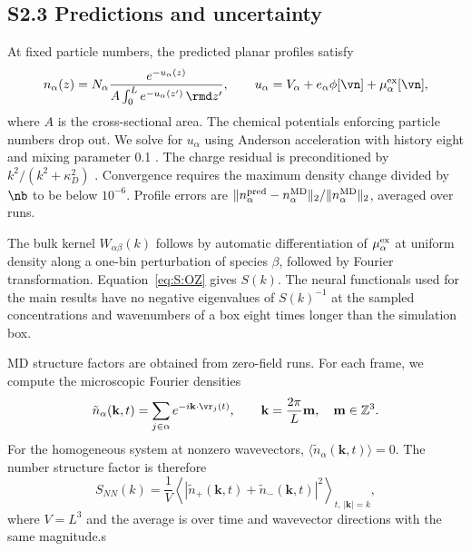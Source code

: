 \subsection*{S2.3 Predictions and uncertainty}
At fixed particle numbers, the predicted planar profiles satisfy
\begin{equation}
n_\alpha(z)=N_\alpha\frac{e^{-u_\alpha(z)}}{A\int_0^L e^{-u_\alpha(z')}\,\rmd z'},\qquad
u_\alpha=V_\alpha+e_\alpha\phi[\vn]+\mu^{\rm ex}_\alpha[\vn],
\label{eq:S:canon}
\end{equation}
where $A$ is the cross-sectional area. The chemical potentials enforcing particle numbers drop out. We solve for $u_\alpha$ using Anderson acceleration with history eight and mixing parameter 0.1 \cite{anderson1965iterative,walker2011anderson}. The charge residual is preconditioned by $k^2/(k^2+\kappa_D^2)$ \cite{kerker1981efficient}. Convergence requires the maximum density change divided by $\nb$ to be below $10^{-6}$. Profile errors are $\|n_\alpha^{\rm pred}-n_\alpha^{\rm MD}\|_2/\|n_\alpha^{\rm MD}\|_2$, averaged over runs.

The bulk kernel $W_{\alpha\beta}(k)$ follows by automatic differentiation of $\mu^{\rm ex}_\alpha$ at uniform density along a one-bin perturbation of species $\beta$, followed by Fourier transformation. Equation~\ref{eq:S:OZ} gives $S(k)$. The neural functionals used for the main results have no negative eigenvalues of $S(k)^{-1}$ at the sampled concentrations and wavenumbers of a box eight times longer than the simulation box.

MD structure factors are obtained from zero-field runs.
For each frame, we compute the microscopic Fourier densities
\[
\tilde n_\alpha(\mathbf k,t)
=
\sum_{j\in\alpha}
e^{-i\mathbf k\cdot\vr_j(t)},
\qquad
\mathbf k=\frac{2\pi}{L}\mathbf m,
\quad \mathbf m\in\mathbb Z^3.
\]
For the homogeneous system at nonzero wavevectors,
$\langle\tilde n_\alpha(\mathbf k,t)\rangle=0$.
The number structure factor is therefore
\[
S_{NN}(k)
=
\frac{1}{V}
\left\langle
\left|
\tilde n_+(\mathbf k,t)+\tilde n_-(\mathbf k,t)
\right|^2
\right\rangle_{t,\,|\mathbf k|=k},
\]
where $V=L^3$ and the average is over time and wavevector
directions with the same magnitude.s
